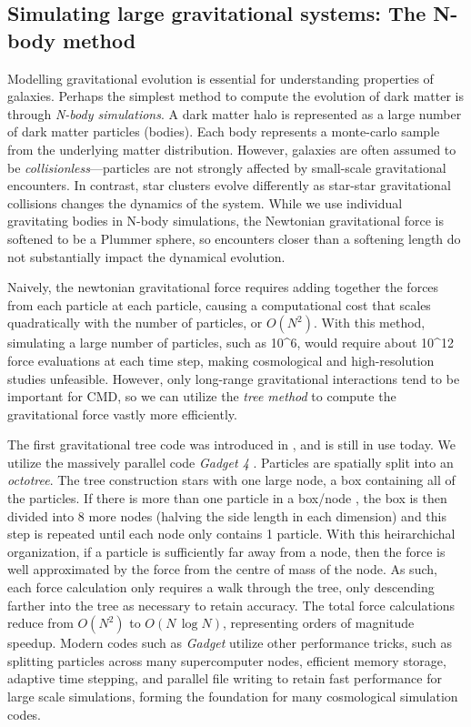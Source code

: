 \subsection{Simulating large gravitational systems: The N-body
method}\label{simulating-large-gravitational-systems-the-n-body-method}

Modelling gravitational evolution is essential for understanding
properties of galaxies. Perhaps the simplest method to compute the
evolution of dark matter is through \emph{N-body simulations}. A dark
matter halo is represented as a large number of dark matter particles
(bodies). Each body represents a monte-carlo sample from the underlying
matter distribution. However, galaxies are often assumed to be
\emph{collisionless}---particles are not strongly affected by
small-scale gravitational encounters. In contrast, star clusters evolve
differently as star-star gravitational collisions changes the dynamics
of the system. While we use individual gravitating bodies in N-body
simulations, the Newtonian gravitational force is softened to be a
Plummer sphere, so encounters closer than a softening length do not
substantially impact the dynamical evolution.

Naively, the newtonian gravitational force requires adding together the
forces from each particle at each particle, causing a computational cost
that scales quadratically with the number of particles, or \(O(N^2)\).
With this method, simulating a large number of particles, such as
10\^{}6, would require about 10\^{}12 force evaluations at each time
step, making cosmological and high-resolution studies unfeasible.
However, only long-range gravitational interactions tend to be important
for CMD, so we can utilize the \emph{tree method} to compute the
gravitational force vastly more efficiently.

The first gravitational tree code was introduced in
\citet{barnes+hut1986}, and is still in use today. We utilize the
massively parallel code \emph{Gadget 4} \citep{gadget4}. Particles are
spatially split into an \emph{octotree}. The tree construction stars
with one large node, a box containing all of the particles. If there is
more than one particle in a box/node , the box is then divided into 8
more nodes (halving the side length in each dimension) and this step is
repeated until each node only contains 1 particle. With this
heirarchichal organization, if a particle is sufficiently far away from
a node, then the force is well approximated by the force from the centre
of mass of the node. As such, each force calculation only requires a
walk through the tree, only descending farther into the tree as
necessary to retain accuracy. The total force calculations reduce from
\(O(N^2)\) to \(O(N\,\log N)\), representing orders of magnitude
speedup. Modern codes such as \emph{Gadget} utilize other performance
tricks, such as splitting particles across many supercomputer nodes,
efficient memory storage, adaptive time stepping, and parallel file
writing to retain fast performance for large scale simulations, forming
the foundation for many cosmological simulation codes.

